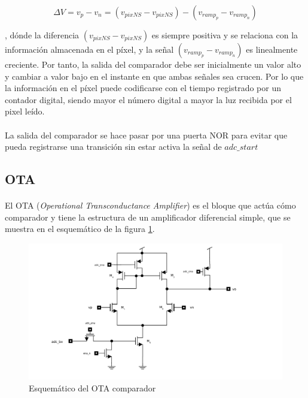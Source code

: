 \begin{equation}
	\Delta V= v_p - v_n = (v_{pixNS}-v_{pixNS}) - (v_{ramp_p}-v_{ramp_n})
\end{equation}

, dónde la diferencia $(v_{pixNS}-v_{pixNS})$ es siempre positiva y se relaciona
con la información almacenada en el píxel, y la señal $(v_{ramp_p}-v_{ramp_n})$ es
linealmente creciente. Por tanto, la salida del comparador debe ser inicialmente
un valor alto y cambiar a valor bajo en el instante en que ambas señales sea crucen.
Por lo que la información en el píxel puede codificarse con el tiempo registrado
por un contador digital, siendo mayor el número digital a mayor la luz recibida
por el pixel leído.

\paragraph{}
La salida del comparador se hace pasar por una puerta NOR para evitar que pueda
registrarse una transición sin estar activa la señal de $adc\_start$

\subsection{OTA}\label{cap:ro_sch_ota}

\paragraph{}
El OTA (\textit{Operational Transconductance Amplifier}) es el bloque que actúa
cómo comparador y tiene la estructura de un amplificador diferencial simple, que
se muestra en el esquemático de la figura \ref{fig:ota_sch}.

\begin{figure}[h]
	\includegraphics[width=\textwidth]{svg/ota_sch.pdf}
	\caption{Esquemático del OTA comparador}
	\label{fig:ota_sch}
\end{figure}

